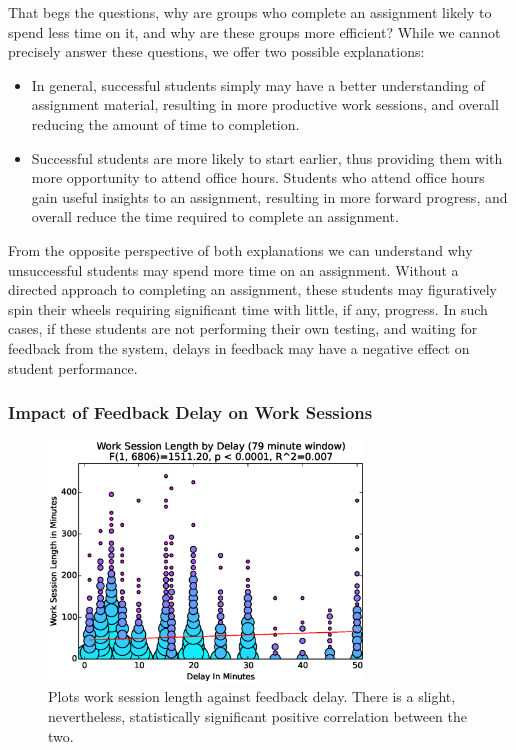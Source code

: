 That begs the questions, why are groups who complete an assignment likely to
spend less time on it, and why are these groups more efficient? While we cannot
precisely answer these questions, we offer two possible explanations:

\begin{itemize}
\item In general, successful students simply may have a better understanding of
  assignment material, resulting in more productive work sessions, and overall
  reducing the amount of time to completion.
\item Successful students are more likely to start earlier, thus providing them
  with more opportunity to attend office hours. Students who attend office
  hours gain useful insights to an assignment, resulting in more forward
  progress, and overall reduce the time required to complete an assignment.
\end{itemize}

From the opposite perspective of both explanations we can understand why
unsuccessful students may spend more time on an assignment. Without a directed
approach to completing an assignment, these students may figuratively spin
their wheels requiring significant time with little, if any, progress. In such
cases, if these students are not performing their own testing, and waiting for
feedback from the system, delays in feedback may have a negative effect on
student performance.


\subsubsection{Impact of Feedback Delay on Work Sessions}

\begin{figure}[!t]
\centering
\includegraphics[width=3.3in]{graphs/Work_Session_Length_by_Delay_(79_minute_window).eps}
\caption{Plots work session length against feedback delay. There is a slight,
  nevertheless, statistically significant positive correlation between the
  two.}
\end{figure}

